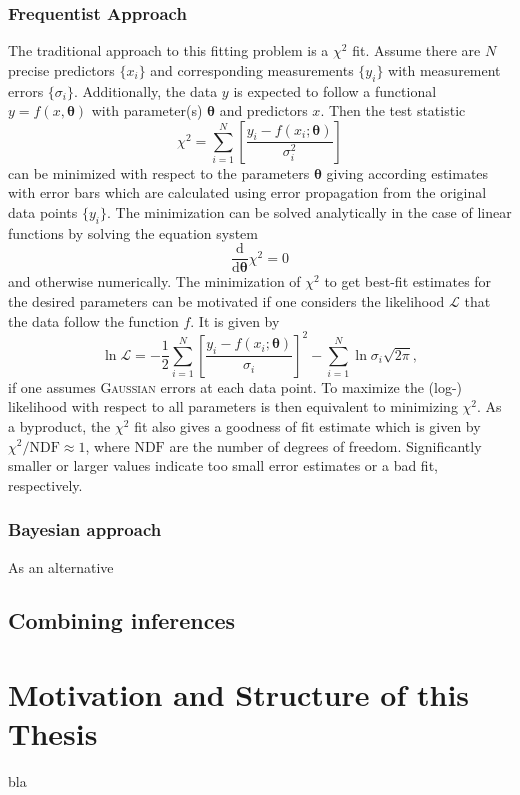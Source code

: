 \subsubsection{Frequentist Approach}
The traditional approach to this fitting problem is a $\chi^2$ fit. Assume there are $N$ precise predictors $\{x_i\}$ and corresponding measurements $\{y_i\}$ with measurement errors $\{\sigma_i\}$. Additionally, the data $y$ is expected to follow a functional $y=f(x,\boldsymbol{\theta})$ with parameter(s) $\boldsymbol{\theta}$ and predictors $x$. Then the test statistic \begin{equation}
	\chi^2=\sum_{i=1}^{N}\left[\frac{y_i-f(x_i;\boldsymbol{\theta})}{\sigma_i^2}\right]
\end{equation}
can be minimized with respect to the parameters $\boldsymbol{\theta}$ giving according estimates with error bars which are calculated using error propagation from the original data points $\{y_i\}$. The minimization can be solved analytically in the case of linear functions by solving the equation system $$\frac{\text{d}}{\text{d}\boldsymbol{\theta}}\chi^2=0$$
and otherwise numerically. The minimization of $\chi^2$ to get best-fit estimates for the desired parameters can be motivated if one considers the likelihood $\mathcal{L}$ that the data follow the function $f$. It is given by \begin{equation}
	\ln\mathcal{L}=-\frac{1}{2}\sum_{i=1}^N\left[\frac{y_i-f(x_i;\boldsymbol{\theta})}{\sigma_i}\right]^2-\sum_{i=1}^N\ln\sigma_i\sqrt{2\pi},
\end{equation}
if one assumes \textsc{Gaussian} errors at each data point. To maximize the (log-) likelihood with respect to all parameters is then equivalent to minimizing $\chi^2$. As a byproduct, the $\chi^2$ fit also gives a goodness of fit estimate which is given by $\chi^2/\text{NDF}\approx 1$, where $\text{NDF}$ are the number of degrees of freedom. Significantly smaller or larger values indicate too small error estimates or a bad fit, respectively. \cite{statistics}
\subsubsection{Bayesian approach}
As an alternative
\subsection{Combining inferences}
\label{subsec:combinf}
\section{Motivation and Structure of this Thesis}
bla
